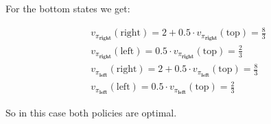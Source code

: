 \begin{solution}
For the bottom states we get:

\begin{align*}
v_{\pi_\textbf{right}}(\text{right})
=
2 + 0.5 \cdot v_{\pi_\textbf{right}}(\text{top})
=
\frac{8}{3}\\
v_{\pi_\textbf{right}}(\text{left})
=
0.5 \cdot v_{\pi_\textbf{right}}(\text{top})
=
\frac{2}{3}\\
v_{\pi_\textbf{left}}(\text{right})
=
2 + 0.5 \cdot v_{\pi_\textbf{left}}(\text{top})
=
\frac{8}{3} \\
v_{\pi_\textbf{left}}(\text{left})
=
0.5 \cdot v_{\pi_\textbf{left}}(\text{top})
=
\frac{2}{3}
\end{align*}

So in this case both policies are optimal.
\end{solution}
